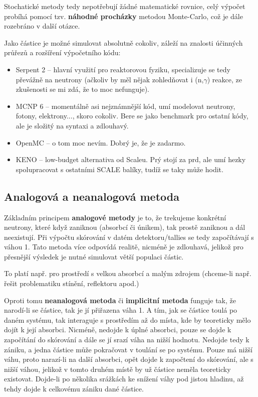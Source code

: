 Stochatické metody tedy nepotřebují žádné matematické rovnice, celý výpočet probíhá pomocí tzv. \textbf{náhodné procházky} metodou Monte-Carlo, což je dále rozebráno v další otázce.

Jako částice je možné simulovat absolutně cokoliv, záleží na znalosti účinných průřezů a rozšíření výpočetního kódu:
\begin{itemize}
  \item Serpent 2 -- hlavní využití pro reaktorovou fyziku, specializuje se tedy převážně na neutrony (ačkoliv by měl nějak zohledňovat i (n,$\gamma$) reakce, ze zkušenosti se mi zdá, že to moc nefunguje).
  \item MCNP 6 -- momentálně asi nejznámnější kód, umí modelovat neutrony, fotony, elektrony..., skoro cokoliv. Bere se jako benchmark pro ostatní kódy, ale je složitý na syntaxi a zdlouhavý.
  \item OpenMC -- o tom moc nevím. Dobrý je, že je zadarmo.
  \item KENO -- low-budget alternativa od Scaleu. Prý stojí za prd, ale umí hezky spolupracovat s ostatními SCALE balíky, tudíž se taky může hodit.
\end{itemize}

\subsection{Analogová a neanalogová metoda}

Základním principem \textbf{analogové metody} je to, že trekujeme konkrétní neutrony, které když zaniknou (absorbcí či únikem), tak prostě zaniknou a dál neexistují. Při výpočtu skórování v datém detektoru/tallies se tedy započítávají s váhou 1. Tato metoda více odpovídá realitě, nicméně je zdlouhavá, jelikož pro přesnější výsledek je nutné simulovat větší populaci částic.

To platí např. pro prostředí s velkou absorbcí a malým zdrojem (chceme-li např. řešit problematiku stínění, reflektoru apod.)

Oproti tomu \textbf{neanalogová metoda} či \textbf{implicitní metoda} funguje tak, že narodí-li se částice, tak je jí přiřazena váha 1. A tím, jak se částice toulá po daném systému, tak interaguje s prostředím až do místa, kde by teoreticky mělo dojít k její absorbci. Nicméně, nedojde k úplné absorbci, pouze se dojde k započítání do skórování a dále se jí srazí váha na nižší hodnotu. Nedojde tedy k zániku, a jedna částice může pokračovat v toulání se po systému. Pouze má nižší váhu, proto narazí-li na další absorbci, opět dojde k započtení do skórování, ale s nižší váhou, jelikož v tomto druhém místě by už částice neměla teoreticky existovat. Dojde-li po několika srážkách ke snížení váhy pod jistou hladinu, až tehdy dojde k celkovému zániku dané částice.


